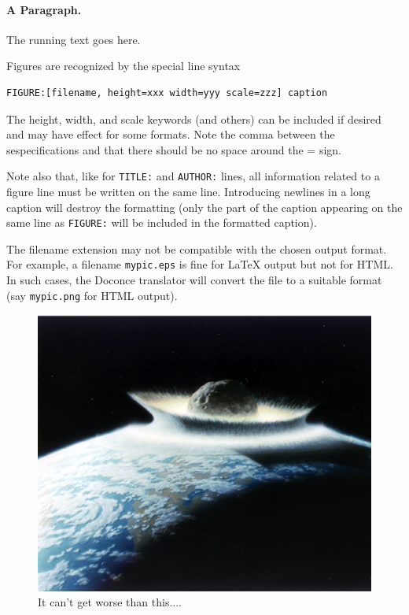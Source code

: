 \documentclass{article}
\begin{document}
\paragraph{A Paragraph.}
The running text goes here.

Figures are recognized by the special line syntax
\begin{Verbatim}[fontsize=\fontsize{9pt}{9pt},tabsize=8,baselinestretch=0.85,
fontfamily=tt,xleftmargin=7mm]
FIGURE:[filename, height=xxx width=yyy scale=zzz] caption
\end{Verbatim}
\noindent
The height, width, and scale keywords (and others) can be included
if desired and may have effect for some formats. Note the comma
between the sespecifications and that there should be no space
around the = sign.

Note also that, like for {\fontsize{10pt}{10pt}\verb!TITLE:!} and {\fontsize{10pt}{10pt}\verb!AUTHOR:!} lines, all information
related to a figure line must be written on the same line. Introducing
newlines in a long caption will destroy the formatting (only the
part of the caption appearing on the same line as {\fontsize{10pt}{10pt}\verb!FIGURE:!} will be
included in the formatted caption).

The filename extension may not be compatible with the chosen output format.
For example, a filename {\fontsize{10pt}{10pt}\verb!mypic.eps!} is fine for {\LaTeX} output but not for
HTML. In such cases, the Doconce translator will convert the file to
a suitable format (say {\fontsize{10pt}{10pt}\verb!mypic.png!} for HTML output).


\begin{figure}
  \centerline{\includegraphics[width=\linewidth]{figs/dinoimpact.ps}}
  \caption{
  It can't get worse than this.... \label{fig:impact}
  \label{fig:dinoimpact}  %
  }
\end{figure}
\end{document}
